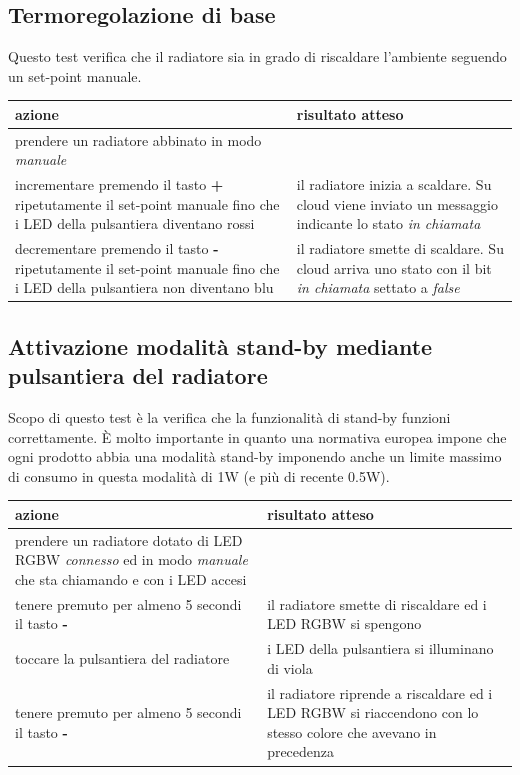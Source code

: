 \documentclass[12pt,a4paper,twoside,titlepage]{book}
\begin{document}
\subsection{Termoregolazione di base}

Questo test verifica che il radiatore sia in grado di riscaldare l'ambiente seguendo un set-point manuale.

\begin{center}
\begin{tabular}{| p{5cm} | p{5cm} |}
    \hline \textbf{azione} & \textbf{risultato atteso} \\
    \hline prendere un radiatore abbinato in modo \textit{manuale} & \\
    \hline incrementare premendo il tasto \textbf{+} ripetutamente il set-point manuale fino che i LED della pulsantiera diventano rossi & il radiatore inizia a scaldare. Su cloud viene inviato un messaggio indicante lo stato \textit{in chiamata} \\
    \hline decrementare premendo il tasto \textbf{-} ripetutamente il set-point manuale fino che i LED della pulsantiera non diventano blu & il radiatore smette di scaldare. Su cloud arriva uno stato con il bit \textit{in chiamata} settato a \textit{false} \\
    \hline
\end{tabular}
\end{center}

\subsection{Attivazione modalità stand-by mediante pulsantiera del radiatore}

Scopo di questo test è la verifica che la funzionalità di stand-by funzioni correttamente.
È molto importante in quanto una normativa europea impone che ogni prodotto abbia una
modalità stand-by imponendo anche un limite massimo di consumo in questa modalità di 1W
(e più di recente 0.5W).

\begin{center}
\begin{tabular}{| p{5cm} | p{5cm} |}
    \hline \textbf{azione} & \textbf{risultato atteso} \\
    \hline prendere un radiatore dotato di LED RGBW \textit{connesso} ed in modo \textit{manuale} che sta chiamando e con i LED accesi & \\
    \hline tenere premuto per almeno 5 secondi il tasto \textbf{-} & il radiatore smette di riscaldare ed i LED RGBW si spengono \\
    \hline toccare la pulsantiera del radiatore & i LED della pulsantiera si illuminano di viola \\
    \hline tenere premuto per almeno 5 secondi il tasto \textbf{-} & il radiatore riprende a riscaldare ed i LED RGBW si riaccendono con lo stesso colore che avevano in precedenza \\
    \hline
\end{tabular}
\end{center}
\end{document}
